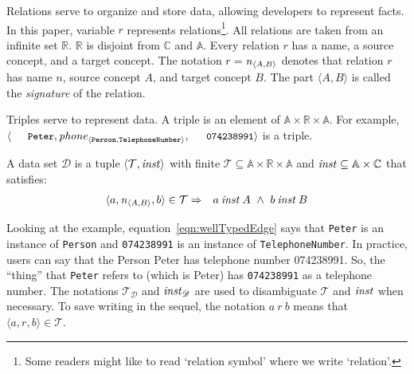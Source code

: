\documentclass[runningheads]{llncs}
\newcommand{\id}[1]{\text{\it #1\/}}
\newcommand{\instance}{\mathbin{\id{inst}}}
\newcommand{\declare}[3]{\id{#1}_{\pair{#2}{#3}}}
\newcommand{\pair}[2]{\langle{#1},{#2}\rangle}
\newcommand{\Pair}[2]{#1\times#2}
\newcommand{\triple}[3]{\langle{#1},{#2},{#3}\rangle}
\newcommand{\atom}[1]{{\tt\small #1}}
\newcommand{\Atoms}{\mathbb{A}}
\newcommand{\Concepts}{\mathbb{C}}
\newcommand{\Rels}{\mathbb{R}}   %
\newcommand{\triples}{\mathcal{T}}
\newcommand{\Triple}[3]{#1\times#2\times#3}
\newcommand{\dataset}{\mathscr{D}}
\def\define#1{\label{dfn:#1}{\em #1}\index{#1}}
\begin{document}
   Relations serve to organize and store data, allowing developers to represent facts.
   In this paper, variable $r$ represents relations\footnote{Some readers might like to read `relation symbol' where we write `relation'.}.
   All relations are taken from an infinite set $\Rels$.
   $\Rels$ is disjoint from $\Concepts$ and $\Atoms$.
   Every relation $r$ has a name, a source concept, and a target concept.
   The notation $r=\declare{n}{A}{B}$ denotes that relation $r$ has name $n$, source concept $A$, and target concept $B$.
   The part $\pair{A}{B}$ is called the \define{signature} of the relation.
   
   Triples serve to represent data.
   A triple %
   is an element of $\Triple{\Atoms}{\Rels}{\Atoms}$.
   For example, $\triple{\text{\atom{Peter}}}{\declare{\id{phone}}{\tt Person}{\tt TelephoneNumber}}{\text{\atom{074238991}}}$ is a triple.
   
   \begin{definition}
   A data set $\dataset$ is a tuple $\pair{\triples}{\instance}$ with finite $\triples \subseteq {\Triple{\Atoms}{\Rels}{\Atoms}}$ and $\instance\subseteq\Pair{\Atoms}{\Concepts}$ that satisfies:
\begin{eqnarray}
   \triple{a}{\declare{n}{A}{B}}{b}\in\triples&\Rightarrow&a\instance A\ \wedge\ b\instance B
\label{eqn:wellTypedEdge}
\end{eqnarray}
\end{definition}
   Looking at the example,
   equation~\ref{eqn:wellTypedEdge} says that \atom{Peter} is an instance of {\tt Person} and \atom{074238991} is an instance of {\tt TelephoneNumber}.
   In practice, users can say that the Person Peter has telephone number 074238991.
   So, the ``thing'' that \atom{Peter} refers to (which is Peter) has \atom{074238991} as a telephone number.
   The notations $\triples_{\dataset}$ and $\instance_{\dataset}$ are used to disambiguate $\triples$ and $\instance$ when necessary.
   To save writing in the sequel, the notation $a\ r\ b$ means that $\triple{a}{r}{b}\in\triples$.
\end{document}
